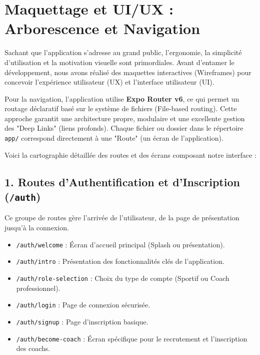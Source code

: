 \section{Maquettage et UI/UX : Arborescence et Navigation}

Sachant que l'application s'adresse au grand public, l'ergonomie, la simplicité d'utilisation et la motivation visuelle sont primordiales. Avant d'entamer le développement, nous avons réalisé des maquettes interactives (Wireframes) pour concevoir l'expérience utilisateur (UX) et l'interface utilisateur (UI).

Pour la navigation, l'application utilise \textbf{Expo Router v6}, ce qui permet un routage déclaratif basé sur le système de fichiers (File-based routing). Cette approche garantit une architecture propre, modulaire et une excellente gestion des "Deep Links" (liens profonds). Chaque fichier ou dossier dans le répertoire \texttt{app/} correspond directement à une "Route" (un écran de l'application).

Voici la cartographie détaillée des routes et des écrans composant notre interface :

\subsection{1. Routes d'Authentification et d'Inscription (\texttt{/auth})}
Ce groupe de routes gère l'arrivée de l'utilisateur, de la page de présentation jusqu'à la connexion.
\begin{itemize}
    \item \texttt{/auth/welcome} : Écran d'accueil principal (Splash ou présentation).
    \item \texttt{/auth/intro} : Présentation des fonctionnalités clés de l'application.
    \item \texttt{/auth/role-selection} : Choix du type de compte (Sportif ou Coach professionnel).
    \item \texttt{/auth/login} : Page de connexion sécurisée.
    \item \texttt{/auth/signup} : Page d'inscription basique.
    \item \texttt{/auth/become-coach} : Écran spécifique pour le recrutement et l'inscription des coachs.
\end{itemize}

